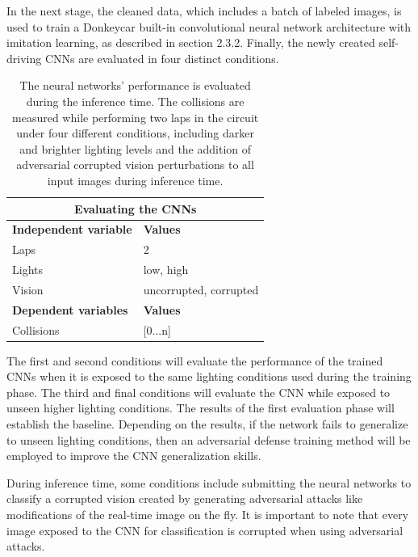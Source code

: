 \documentclass[12pt]{article}
\begin{document}
In the next stage, the cleaned data, which includes a batch of labeled images, is used to train a Donkeycar built-in convolutional neural network architecture with imitation learning, as described in section 2.3.2. Finally, the newly created self-driving CNNs are evaluated in four distinct conditions. 

\begin{table}[H]
\begin{center}
\begin{tabular}{  |p{8cm}|p{4cm}| } 

\hline
\multicolumn{2}{|c|}{\textbf{Evaluating the CNNs}} \\
\hline
\textbf{Independent variable} & \textbf{Values} \\
\hline
Laps & 2 \\ 
Lights & low, high \\ 
Vision & uncorrupted, corrupted \\ 
\hline
\textbf{Dependent variables} & \textbf{Values} \\
\hline
Collisions & [0...n] \\ 
\hline
\end{tabular}
\caption{\label{tab:indvar}The neural networks' performance is evaluated during the inference time. The collisions are measured while performing two laps in the circuit under four different conditions, including darker and brighter lighting levels and the addition of adversarial corrupted vision perturbations to all input images during inference time.
}
\end{center}
\end{table}

The first and second conditions will evaluate the performance of the trained CNNs when it is exposed to the same lighting conditions used during the training phase. The third and final conditions will evaluate the CNN while exposed to unseen higher lighting conditions. The results of the first evaluation phase will establish the baseline. Depending on the results, if the network fails to generalize to unseen lighting conditions, then an adversarial defense training method will be employed to improve the CNN generalization skills. 

During inference time, some conditions include submitting the neural networks to classify a corrupted vision created by generating adversarial attacks like modifications of the real-time image on the fly. It is important to note that every image exposed to the CNN for classification is corrupted when using adversarial attacks.
\end{document}
